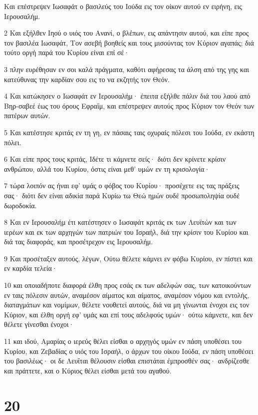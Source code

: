 \par Και επέστρεψεν Ιωσαφάτ ο βασιλεύς του Ιούδα εις τον οίκον αυτού εν ειρήνη, εις Ιερουσαλήμ.
\par 2 Και εξήλθεν Ιηού ο υιός του Ανανί, ο βλέπων, εις απάντησιν αυτού, και είπε προς τον βασιλέα Ιωσαφάτ, Τον ασεβή βοηθείς και τους μισούντας τον Κύριον αγαπάς; διά τούτο οργή παρά του Κυρίου είναι επί σέ·
\par 3 πλην ευρέθησαν εν σοι καλά πράγματα, καθότι αφήρεσας τα άλση από της γης και κατεύθυνας την καρδίαν σου εις το να εκζητής τον Θεόν.
\par 4 Και κατώκησεν ο Ιωσαφάτ εν Ιερουσαλήμ· έπειτα εξήλθε πάλιν διά του λαού από Βηρ-σαβεέ έως του όρους Εφραΐμ, και επέστρεψεν αυτούς προς Κύριον τον Θεόν των πατέρων αυτών.
\par 5 Και κατέστησε κριτάς εν τη γη, εν πάσαις ταις οχυραίς πόλεσι του Ιούδα, εν εκάστη πόλει.
\par 6 Και είπε προς τους κριτάς, Ιδέτε τι κάμνετε σείς· διότι δεν κρίνετε κρίσιν ανθρώπου, αλλά του Κυρίου, όστις είναι μεθ' υμών εν τη κρισολογία·
\par 7 τώρα λοιπόν ας ήναι εφ' υμάς ο φόβος του Κυρίου· προσέχετε εις τας πράξεις σας· διότι δεν είναι αδικία παρά Κυρίω τω Θεώ ημών ουδέ προσωποληψία ουδέ δωροδοκία.
\par 8 Και εν Ιερουσαλήμ έτι κατέστησεν ο Ιωσαφάτ κριτάς εκ των Λευϊτών και των ιερέων και εκ των αρχηγών των πατριών του Ισραήλ, διά την κρίσιν του Κυρίου και διά τας διαφοράς, και προσέτρεχον εις Ιερουσαλήμ.
\par 9 Και προσέταξεν αυτούς, λέγων, Ούτω θέλετε κάμνει εν φόβω Κυρίου, εν πίστει και εν καρδία τελεία·
\par 10 και οποιαδήποτε διαφορά έλθη προς εσάς εκ των αδελφών σας, των κατοικούντων εν ταις πόλεσιν αυτών, αναμέσον αίματος και αίματος, αναμέσον νόμου και εντολής, διαταγμάτων και νομίμων, θέλετε νουθετεί αυτούς, διά να μη γίνωνται ένοχοι εις τον Κύριον, και έλθη οργή εφ' υμάς και επί τους αδελφούς υμών· ούτω κάμνετε, και δεν θέλετε γίνεσθαι ένοχοι·
\par 11 και ιδού, Αμαρίας ο ιερεύς θέλει είσθαι ο αρχηγός υμών εν πάση υποθέσει του Κυρίου, και Ζεβαδίας ο υιός του Ισραήλ, ο άρχων του οίκου Ιούδα, εν πάση υποθέσει του βασιλέως· οι δε Λευΐται θέλουσιν είσθαι επιστάται έμπροσθέν σας· ανδρίζεσθε και πράττετε, και ο Κύριος θέλει είσθαι μετά του αγαθού.

\chapter{20}

